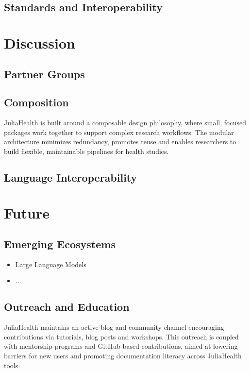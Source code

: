\documentclass{juliacon}
\begin{document}
\subsection{Standards and Interoperability}

\section{Discussion}

\subsection{Partner Groups}

\subsection{Composition}
JuliaHealth is built around a composable design philosophy, where small, focused packages work together to support complex research workflows. The modular architecture minimizes redundancy, promotes reuse and enables researchers to build flexible, maintainable pipelines for health studies.

\subsection{Language Interoperability}

\section{Future}

\subsection{Emerging Ecosystems}

\begin{itemize}
    \item Large Language Models
    \item ....
\end{itemize}

\subsection{Outreach and Education}
JuliaHealth maintains an active blog and community channel encouraging contributions via tutorials, blog posts and workshops. This outreach is coupled with mentorship programs and GitHub-based contributions, aimed at lowering barriers for new users and promoting documentation literacy across JuliaHealth tools.
\end{document}
